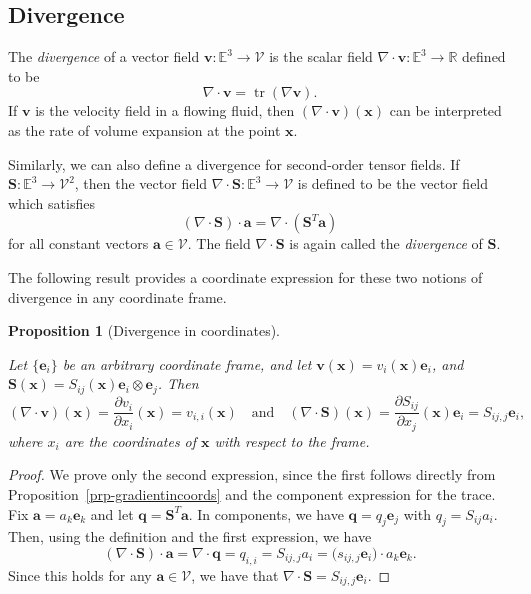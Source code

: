 \documentclass[
  letterpaper,
  DIV=11,
  numbers=noendperiod]{scrreprt}
\theoremstyle{plain}
\newtheorem{proposition}{Proposition}[chapter]
\theoremstyle{remark}
\begin{document}
\subsection{Divergence}\label{divergence}

The \emph{divergence} of a vector field
\({\boldsymbol{v}}:{\mathbb{E}}^3\to{\mathcal{V}}\) is the scalar field
\(\nabla\cdot{\boldsymbol{v}}:{\mathbb{E}}^3\to{\mathbb{R}}\) defined to
be
\[\nabla\cdot{\boldsymbol{v}}= {\operatorname{tr}}(\nabla{\boldsymbol{v}}).\]
If \({\boldsymbol{v}}\) is the velocity field in a flowing fluid, then
\((\nabla\cdot{\boldsymbol{v}})({\boldsymbol{x}})\) can be interpreted
as the rate of volume expansion at the point \({\boldsymbol{x}}\).

Similarly, we can also define a divergence for second-order tensor
fields. If \({\boldsymbol{S}}:{\mathbb{E}}^3\to{\mathcal{V}}^2\), then
the vector field
\(\nabla\cdot{\boldsymbol{S}}:{\mathbb{E}}^3\to{\mathcal{V}}\) is
defined to be the vector field which satisfies
\[(\nabla \cdot {\boldsymbol{S}})\cdot {\boldsymbol{a}}= \nabla \cdot({\boldsymbol{S}}^T{\boldsymbol{a}})\]
for all constant vectors \({\boldsymbol{a}}\in{\mathcal{V}}\). The field
\(\nabla\cdot{\boldsymbol{S}}\) is again called the \emph{divergence} of
\({\boldsymbol{S}}\).

The following result provides a coordinate expression for these two
notions of divergence in any coordinate frame.

\begin{proposition}[Divergence in
coordinates]\protect\hypertarget{prp-divincoords}{}\label{prp-divincoords}

Let \(\{{\boldsymbol{e}}_i\}\) be an arbitrary coordinate frame, and let
\({\boldsymbol{v}}({\boldsymbol{x}}) = v_i({\boldsymbol{x}}){\boldsymbol{e}}_i\),
and
\({\boldsymbol{S}}({\boldsymbol{x}}) = S_{ij}({\boldsymbol{x}}){\boldsymbol{e}}_i\otimes{\boldsymbol{e}}_j\).
Then
\[(\nabla\cdot{\boldsymbol{v}})({\boldsymbol{x}}) = \frac{\partial v_i}{\partial x_i}({\boldsymbol{x}}) = v_{i,i}({\boldsymbol{x}})
    \quad\text{and}\quad (\nabla\cdot{\boldsymbol{S}})({\boldsymbol{x}}) = \frac{\partial S_{ij}}{\partial x_j}({\boldsymbol{x}}){\boldsymbol{e}}_i = S_{ij,j}{\boldsymbol{e}}_i,\]
where \(x_i\) are the coordinates of \({\boldsymbol{x}}\) with respect
to the frame.

\end{proposition}

\begin{proof}
We prove only the second expression, since the first follows directly
from Proposition~\ref{prp-gradientincoords} and the component expression
for the trace. Fix \({\boldsymbol{a}}= a_k{\boldsymbol{e}}_k\) and let
\({\boldsymbol{q}}= {\boldsymbol{S}}^T{\boldsymbol{a}}\). In components,
we have \({\boldsymbol{q}}= q_j{\boldsymbol{e}}_j\) with
\(q_j = S_{ij}a_i\). Then, using the definition and the first
expression, we have
\[(\nabla \cdot{\boldsymbol{S}})\cdot{\boldsymbol{a}}= \nabla\cdot{\boldsymbol{q}}= q_{i,i} = S_{ij,j}a_i = \big(s_{ij,j}{\boldsymbol{e}}_i\big)\cdot a_k{\boldsymbol{e}}_k.\]
Since this holds for any \({\boldsymbol{a}}\in{\mathcal{V}}\), we have
that \(\nabla \cdot{\boldsymbol{S}}= S_{ij,j}{\boldsymbol{e}}_i\).
\end{proof}
\end{document}
